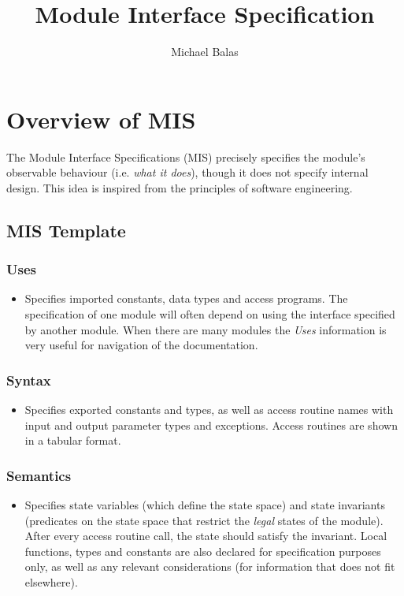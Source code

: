 \documentclass[12pt,fleqn]{article}
\title{Module Interface Specification}
\author{Michael Balas}
\begin{document}
\maketitle
\section*{Overview of MIS}
The Module Interface Specifications (MIS) precisely specifies the module's observable behaviour (i.e. \textit{what it does}), though it does not specify internal design. This idea is inspired from the principles of software engineering. 
\subsection*{MIS Template}
\subsubsection*{Uses}
\begin{itemize}
\item Specifies imported constants, data types and access programs. The specification of one module will often depend on using the interface specified by another module. When there are many modules the \emph{Uses} information is very useful for navigation of the documentation.
\end{itemize}
\subsubsection*{Syntax}
\begin{itemize}
\item Specifies exported constants and types, as well as access routine names with input and output parameter types and exceptions. Access routines are shown in a tabular format. 
\end{itemize}
\subsubsection*{Semantics}
\begin{itemize}
\item Specifies state variables (which define the state space) and state invariants (predicates on the state space that restrict the \textit{legal} states of the module). After every access routine call, the state should satisfy the invariant. Local functions, types and constants are also declared for specification purposes only, as well as any relevant considerations (for information that does not fit elsewhere). 
\end{itemize}
\end{document}
